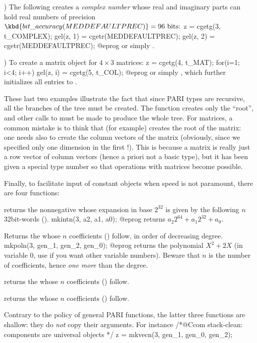 ) The following creates a \emph{complex number} whose real and
imaginary parts can hold real numbers of precision
$\kbd{bit\_accuracy(MEDDEFAULTPREC)} = 96\hbox{ bits:}$
%
\bprog
  z = cgetg(3, t_COMPLEX);
  gel(z, 1) = cgetr(MEDDEFAULTPREC);
  gel(z, 2) = cgetr(MEDDEFAULTPREC);
@eprog\noindent
or simply .

) To create a matrix object for $4\times 3$ matrices:
%
\bprog
  z = cgetg(4, t_MAT);
  for(i=1; i<4; i++) gel(z, i) = cgetg(5, t_COL);
@eprog\noindent
or simply , which further initializes all entries
to .

These last two examples illustrate the fact that since PARI types are
recursive, all the branches of the tree must be created. The function
 creates only the ``root'', and other calls to  must be
made to produce the whole tree. For matrices, a common mistake is to think
that  (for example) creates the root of the
matrix: one needs also to create the column vectors of the matrix (obviously,
since we specified only one dimension in the first !). This is
because a matrix is really just a row vector of column vectors (hence a
priori not a basic type), but it has been given a special type number so that
operations with matrices become possible.

Finally, to facilitate input of constant objects when speed is not paramount,
there are four  functions:

returns the nonnegative  whose expansion in base $2^{32}$
is given by the following $n$ 32bit-words ().
\bprog
  mkintn(3, a2, a1, a0);
@eprog
\noindent returns $a_2 2^{64} + a_1 2^{32} + a_0$.

Returns the  whose $n$ coefficients () follow, in order of
decreasing degree.
\bprog
  mkpoln(3, gen_1, gen_2, gen_0);
@eprog
\noindent returns the polynomial $X^2 + 2X$ (in variable $0$, use
 if you want other variable numbers). Beware that $n$ is the
number of coefficients, hence \emph{one more} than the degree.

returns the  whose $n$ coefficients () follow.

returns the  whose $n$ coefficients () follow.

 Contrary to the policy of general PARI functions, the
latter three functions are shallow: they do \emph{not} copy their arguments.
For instance
\bprog
  /*@Ccom stack-clean: components are universal objects */
  z = mkvecn(3, gen_1, gen_0, gen_2);

